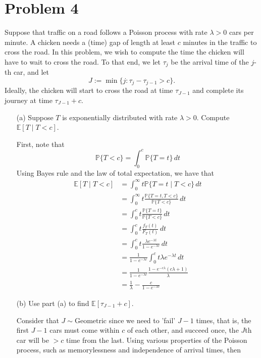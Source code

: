 \documentclass[11pt]{article}
\newcommand{\bbE}{\mathbb{E}}
\newcommand{\bbP}{\mathbb{P}}
\begin{document}
\section*{Problem 4}
\begin{problem}
    Suppose that traffic on a road follows a Poisson process with rate \(\lambda > 0\) cars per minute. A chicken needs a (time) gap of length at least \(c\) minutes in the traffic to cross the road. In this problem, we wish to compute the time the chicken will have to wait to cross the road. To that end, we let \(\tau_j\) be the arrival time of the \(j\)-th car, and let 
\[
J := \min \{ j : \tau_j - \tau_{j-1} > c \}.
\]
Ideally, the chicken will start to cross the road at time \(\tau_{J-1}\) and complete its journey at time \(\tau_{J-1} + c\).

\begin{enumerate}
    \item[(a)] Suppose \(T\) is exponentially distributed with rate \(\lambda > 0\). Compute \(\mathbb{E}[T \mid T < c]\).
    \begin{solution}
    First, note that 
    \[\bbP\{T < c\} = \int_0^c \bbP\{T = t\}\, dt\]
        Using Bayes rule and the law of total expectation, we have that 
        \begin{align*}
            \bbE[T \mid T< c] &= \int_0^\infty t \bbP\{T = t\mid T<c\}\, dt\\
             &=\int_0^\infty t \frac{\bbP\{T = t ,T< c\}}{\bbP\{T< c\}}\, dt\\
             &= \int_0^c t\frac{\bbP\{T = t\}}{\bbP\{T < c\}}\,dt\\
             &= \int_0^c t \frac{f_T(t)}{F_T(t)}\, dt\\
             &= \int_0^c t \frac{\lambda e^{-\lambda t}}{1- e^{-\lambda c}}\, dt\\
             &= \frac{1}{1- e^{-\lambda c}}\int_0^c t\lambda e^{-\lambda t}\, dt\\
             &= \frac{1}{1- e^{-\lambda c}} \frac{1 - e^{-c\lambda}(c\lambda + 1)}{\lambda}\\
             &= \boxed{\frac{1}{\lambda} - \frac{c}{1- e^{-\lambda c}}}
        \end{align*}
    \end{solution}
    \item[(b)] Use part (a) to find \(\mathbb{E}[\tau_{J-1} + c]\).
\begin{solution}
Consider that $J \sim \text{Geometric}$ since we need to 'fail' $J-1$ times, that is, the first $J-1$ cars must come within $c$ of each other, and succeed once, the $J$th car will be $>c$ time from the last. Using various properties of the Poisson process, such as memorylessness and independence of arrival times, then

\end{solution}
\end{enumerate}
\end{problem}
\end{document}
